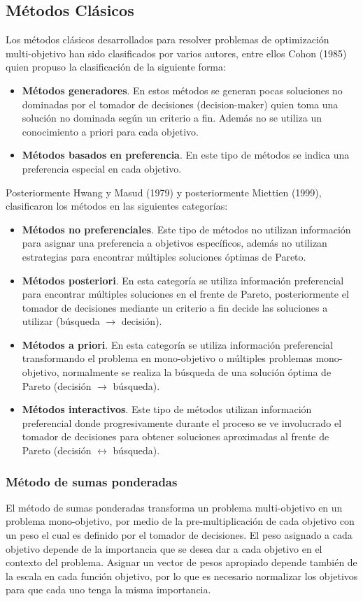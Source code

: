 \subsection{Métodos Clásicos}

Los métodos clásicos desarrollados para resolver problemas de optimización multi-objetivo han sido clasificados por varios autores, entre ellos Cohon (1985) quien propuso la clasificación de la siguiente forma:
\begin{itemize}
\item \textbf{Métodos generadores}. En estos métodos se generan pocas soluciones no dominadas por el tomador de decisiones (decision-maker) quien toma una solución no dominada según un criterio a fin. Además no se utiliza un conocimiento a priori para cada objetivo.
\item \textbf{Métodos basados en preferencia}. En este tipo de métodos se indica una preferencia especial en cada objetivo. 
\end{itemize}
Posteriormente Hwang y Masud (1979) y posteriormente Miettien (1999), clasificaron los métodos en las siguientes categorías:
\begin{itemize}
\item \textbf{Métodos no preferenciales}. Este tipo de métodos no utilizan información para asignar una preferencia a objetivos específicos, además no utilizan estrategias para encontrar múltiples soluciones óptimas de Pareto.
\item \textbf{Métodos posteriori}. En esta categoría se utiliza información preferencial para encontrar múltiples soluciones en el frente de Pareto, posteriormente el tomador de decisiones mediante un criterio a fin decide las soluciones a utilizar (búsqueda $\rightarrow$ decisión).
\item \textbf{Métodos a priori}. En esta categoría se utiliza información preferencial transformando el problema en mono-objetivo o múltiples problemas mono-objetivo, normalmente se realiza la búsqueda de una solución óptima de Pareto (decisión $\rightarrow$ búsqueda).
\item \textbf{Métodos interactivos}. Este tipo de métodos utilizan información preferencial donde progresivamente durante el proceso se ve involucrado el tomador de decisiones para obtener soluciones aproximadas al frente de Pareto (decisión $\leftrightarrow$ búsqueda). 
\end{itemize}
	
\subsubsection{Método de sumas ponderadas}
El método de sumas ponderadas transforma un problema multi-objetivo en un problema mono-objetivo, por medio de la pre-multiplicación de cada objetivo con un peso el cual es definido por el tomador de decisiones.  El peso asignado a cada objetivo depende de la importancia que se desea dar a cada objetivo en el contexto del problema. Asignar un vector de pesos apropiado depende también de la escala en cada función objetivo, por lo que es necesario normalizar los objetivos para que cada uno tenga la misma importancia.

